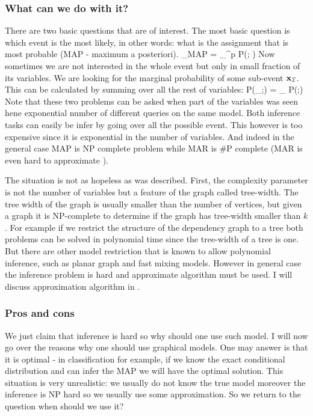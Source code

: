 \subsubsection{What can we do with it?}
There are two basic questions that are of interest.
The most basic question is which event is the most likely, in other words: what is the assignment that is most probable (MAP - maximum a posteriori).
\be
\label{eq:MAP}
\xx_{MAP} = \arg \max_{\xx \in \cX^p} P(\xx; \thetav) 
\ee
Now sometimes we are not interested in the whole event but only in small fraction of its variables.
We are looking for the marginal probability of some sub-event ${\bf x}_{{\cal I}}$.
This can be calculated by summing over all the rest of variables:
\be
\label{eq:MAR}
P(\xx_{\cI};\thetav) = \sum_{} P(\zz;\thetav)
\ee
Note that these two problems can be asked when part of the variables was seen hene exponential number of different queries on the same model. 
Both inference tasks can easily be infer by going over all the possible event.
This however is too expensive since it is exponential in the number of variables.
And indeed in the general case MAP\cite{shimony1994finding} is NP complete problem while MAR\cite{cooper1990computational} is \#P complete (MAR is even hard to approximate \cite{roth1996hardness}).

The situation is not as hopeless as was described.
First, the complexity parameter is not the number of variables but a feature of the graph called tree-width\cite{robertson1983graph,robertson1994quickly}.
The tree width of the graph is usually smaller than the number of vertices, but given a graph it is NP-complete to determine if the graph has tree-width smaller than $k$\cite{Arnborg:1987}.
For example if we restrict the structure of the dependency graph to a tree both problems can be solved in polynomial time since the tree-width of a tree is one.
But there are other model restriction that is known to allow polynomial inference, such as planar graph \cite{jaakkola2007approximate} and fast mixing models\cite{jerrum1993polynomial}.
However in general case the inference problem is hard and approximate algorithm must be used. I will discuss approximation algorithm  in  . 
\subsubsection{Pros and cons}
We just claim that inference is hard so why should one use such model.
I will now go over the reasons why one should use graphical models.
One may answer is that it is optimal - in classification for example, if we know the exact conditional distribution and can infer the MAP we will have the optimal solution. This situation is very unrealistic: we usually do not know the true model moreover the inference is NP hard so we usually use some approximation. So we return to the question when should we use it?

